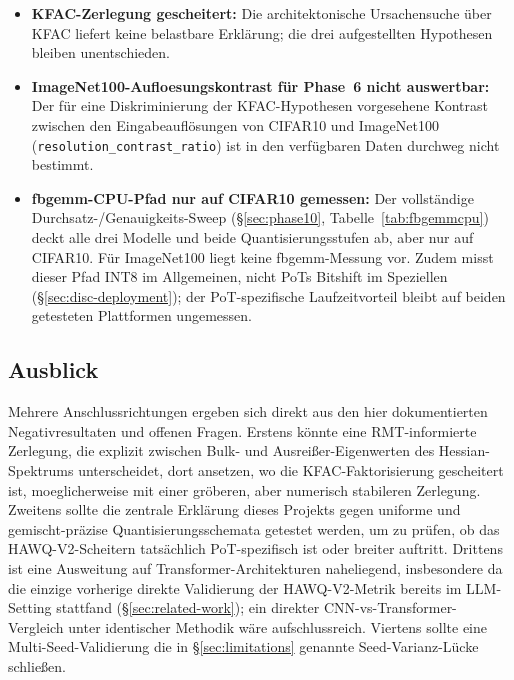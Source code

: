 \begin{itemize}
\item \textbf{KFAC-Zerlegung gescheitert:} Die architektonische Ursachensuche über KFAC liefert keine belastbare Erklärung; die drei aufgestellten Hypothesen bleiben unentschieden.

\item \textbf{ImageNet100-Aufloesungskontrast für Phase~6 nicht auswertbar:} Der für eine Diskriminierung der KFAC-Hypothesen vorgesehene Kontrast zwischen den Eingabeauflösungen von CIFAR10 und ImageNet100 (\texttt{resolution\_contrast\_ratio}) ist in den verfügbaren Daten durchweg nicht bestimmt.

\item \textbf{fbgemm-CPU-Pfad nur auf CIFAR10 gemessen:} Der vollständige Durchsatz-/Genauigkeits-Sweep (\S\ref{sec:phase10}, Tabelle~\ref{tab:fbgemmcpu}) deckt alle drei Modelle und beide Quantisierungsstufen ab, aber nur auf CIFAR10. Für ImageNet100 liegt keine fbgemm-Messung vor. Zudem misst dieser Pfad INT8 im Allgemeinen, nicht PoTs Bitshift im Speziellen (\S\ref{sec:disc-deployment}); der PoT-spezifische Laufzeitvorteil bleibt auf beiden getesteten Plattformen ungemessen.
\end{itemize}

\subsection{Ausblick}
\label{sec:outlook}

Mehrere Anschlussrichtungen ergeben sich direkt aus den hier dokumentierten Negativresultaten und offenen Fragen. Erstens könnte eine RMT-informierte Zerlegung, die explizit zwischen Bulk- und Ausreißer-Eigenwerten des Hessian-Spektrums unterscheidet, dort ansetzen, wo die KFAC-Faktorisierung gescheitert ist, moeglicherweise mit einer gröberen, aber numerisch stabileren Zerlegung. Zweitens sollte die zentrale Erklärung dieses Projekts gegen uniforme und gemischt-präzise Quantisierungsschemata getestet werden, um zu prüfen, ob das HAWQ-V2-Scheitern tatsächlich PoT-spezifisch ist oder breiter auftritt. Drittens ist eine Ausweitung auf Transformer-Architekturen naheliegend, insbesondere da die einzige vorherige direkte Validierung der HAWQ-V2-Metrik \citep{hill2026saturationmakesquantizationerror} bereits im LLM-Setting stattfand (\S\ref{sec:related-work}); ein direkter CNN-vs-Transformer-Vergleich unter identischer Methodik wäre aufschlussreich. Viertens sollte eine Multi-Seed-Validierung die in \S\ref{sec:limitations} genannte Seed-Varianz-Lücke schließen.